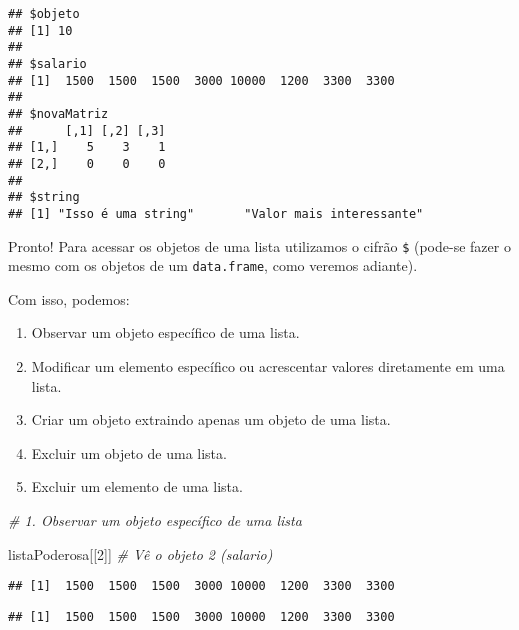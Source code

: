 \documentclass[
]{article}
\newenvironment{Shaded}{\begin{snugshade}}{\end{snugshade}}
\newcommand{\CommentTok}[1]{\textcolor[rgb]{0.56,0.35,0.01}{\textit{#1}}}
\newcommand{\DecValTok}[1]{\textcolor[rgb]{0.00,0.00,0.81}{#1}}
\newcommand{\NormalTok}[1]{#1}
\newcommand{\OperatorTok}[1]{\textcolor[rgb]{0.81,0.36,0.00}{\textbf{#1}}}
\begin{document}
\begin{verbatim}
## $objeto
## [1] 10
## 
## $salario
## [1]  1500  1500  1500  3000 10000  1200  3300  3300
## 
## $novaMatriz
##      [,1] [,2] [,3]
## [1,]    5    3    1
## [2,]    0    0    0
## 
## $string
## [1] "Isso é uma string"       "Valor mais interessante"
\end{verbatim}

Pronto! Para acessar os objetos de uma lista utilizamos o cifrão
\texttt{\$} (pode-se fazer o mesmo com os objetos de um
\texttt{data.frame}, como veremos adiante).

Com isso, podemos:

\begin{enumerate}
\def\labelenumi{\arabic{enumi}.}
\item
  Observar um objeto específico de uma lista.
\item
  Modificar um elemento específico ou acrescentar valores diretamente em
  uma lista.
\item
  Criar um objeto extraindo apenas um objeto de uma lista.
\item
  Excluir um objeto de uma lista.
\item
  Excluir um elemento de uma lista.
\end{enumerate}

\begin{Shaded}
\begin{Highlighting}[]
\CommentTok{# 1. Observar um objeto específico de uma lista}

\NormalTok{listaPoderosa[[}\DecValTok{2}\NormalTok{]] }\CommentTok{# Vê o objeto 2 (salario)}
\end{Highlighting}
\end{Shaded}

\begin{verbatim}
## [1]  1500  1500  1500  3000 10000  1200  3300  3300
\end{verbatim}

\begin{Shaded}
\end{Shaded}

\begin{verbatim}
## [1]  1500  1500  1500  3000 10000  1200  3300  3300
\end{verbatim}
\end{document}
